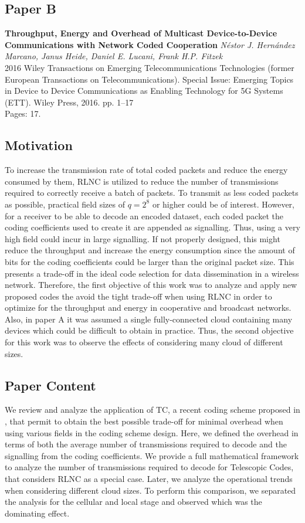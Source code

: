 \clearpage

\subsection{Paper B}
\textbf{Throughput, Energy and Overhead of Multicast Device-to-Device Communications with Network Coded Cooperation}
\textit{N\'estor J. Hern\'andez Marcano, Janus Heide, Daniel E. Lucani, Frank H.P. Fitzek}
\\  2016 Wiley Transactions on Emerging Telecommunications Technologies (former
European Transactions on Telecommunications). Special Issue: Emerging Topics in
Device to Device Communications as Enabling Technology for 5G Systems (ETT). Wiley Press, 2016. pp. 1--17
\\ Pages: 17.

\subsection*{Motivation}
To increase the transmission rate of total coded packets and reduce the energy consumed by them, \ac{RLNC} is utilized to reduce the number of transmissions required to correctly receive a batch of packets. To transmit as less coded packets as possible, practical field sizes of $q = 2^8$ or higher could be of interest. However, for a receiver to be able to decode an encoded dataset, each coded packet the coding coefficients used to create it are appended as signalling. Thus, using a very high field could incur in large signalling. If not properly designed, this might reduce the throughput and increase the energy consumption since the amount of bits for the coding coefficients could be larger than the original packet size. This presents a trade-off in the ideal code selection for data dissemination in a wireless network. Therefore, the first objective of this work was to analyze and apply new proposed codes the avoid the tight trade-off when using \ac{RLNC} in order to optimize for the throughput and energy in cooperative and broadcast networks. Also, in paper A it was assumed a single fully-connected cloud containing many devices which could be difficult to obtain in practice. Thus, the second objective for this work was to observe the effects of considering many cloud of different sizes.

\subsection*{Paper Content}
We review and analyze the application of \ac{TC}, a recent coding scheme proposed in \cite{heidelucani2015composite}, that permit to obtain the best possible trade-off for minimal overhead when using various fields in the coding scheme design. Here, we defined the overhead in terms of both the average number of transmissions required to decode and the signalling from the coding coefficients. We provide a full mathematical framework to analyze the number of transmissions required to decode for Telescopic Codes, that considers \ac{RLNC} as a special case. Later, we analyze the operational trends when considering different cloud sizes. To perform this comparison, we separated the analysis for the cellular and local stage and observed which was the dominating effect.

